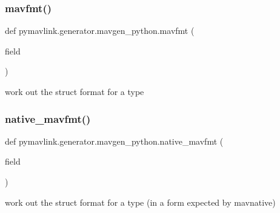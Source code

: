 \subsubsection{\texorpdfstring{mavfmt()}{mavfmt()}}
{\footnotesize\ttfamily def pymavlink.\+generator.\+mavgen\+\_\+python.\+mavfmt (\begin{DoxyParamCaption}\item[{}]{field }\end{DoxyParamCaption})}

\begin{DoxyVerb}work out the struct format for a type\end{DoxyVerb}
 \mbox{\label{namespacepymavlink_1_1generator_1_1mavgen__python_aa80503aac0716bddd09ad1395f7dd2d5}} 
\subsubsection{\texorpdfstring{native\+\_\+mavfmt()}{native\_mavfmt()}}
{\footnotesize\ttfamily def pymavlink.\+generator.\+mavgen\+\_\+python.\+native\+\_\+mavfmt (\begin{DoxyParamCaption}\item[{}]{field }\end{DoxyParamCaption})}

\begin{DoxyVerb}work out the struct format for a type (in a form expected by mavnative)\end{DoxyVerb}
 